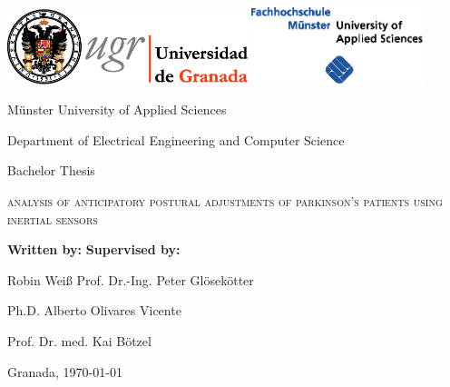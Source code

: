 \begin{titlepage}
\label{ch:titlepage}
\begin{center}

\includegraphics[width=7cm]{images/universidad_de_granada.eps}
	\hfill
\includegraphics[width=5cm]{images/fh-muenster.eps}
	\hspace{1.0cm}
	\\ 

\vspace{3cm}

{\Large Münster University of Applied Sciences}

Department of Electrical Engineering and Computer Science

\vspace{1cm}

{\Large Bachelor Thesis}

\vspace{1cm}

{\huge \textsc{analysis of anticipatory postural adjustments of parkinson's patients using inertial sensors}}

\vspace{1cm}

\end{center}

\vspace{1.5cm}

\textbf{Written by:}  \hfill \textbf{Supervised by:}

Robin Weiß \hfill Prof. Dr.-Ing. Peter Gl\"{o}sek\"{o}tter 

\hfill Ph.D. Alberto Olivares Vicente

\hfill Prof. Dr. med. Kai B\"{o}tzel

\vfill

Granada, \today

\end{titlepage}
